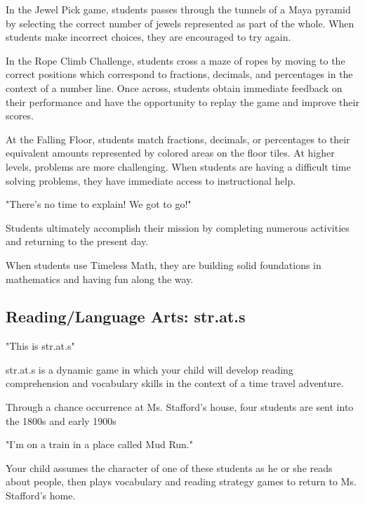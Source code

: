 In the Jewel Pick game, students passes through the tunnels of a Maya pyramid by selecting the correct number of jewels represented as part of the whole.
When students make incorrect choices, they are encouraged to try again.

In the Rope Climb Challenge, students cross a maze of ropes by moving to the correct positions which correspond to fractions, decimals, and percentages in the context of a number line.
Once across, students obtain immediate feedback on their performance and have the opportunity to replay the game and improve their scores.

At the Falling Floor, students match fractions, decimals, or percentages to their equivalent amounts represented by colored areas on the floor tiles.
At higher levels, problems are more challenging.
When students are having a difficult time solving problems, they have immediate access to instructional help.

"There's no time to explain!
We got to go!"

Students ultimately accomplish their mission by completing numerous activities and returning to the present day.

When students use Timeless Math, they are building solid foundations in mathematics and having fun along the way.

\subsection{Reading/Language Arts: str.at.s}

"This is str.at.s"

str.at.s is a dynamic game in which your child will develop reading comprehension and vocabulary skills in the context of a time travel adventure.

Through a chance occurrence at Ms. Stafford's house, four students are sent into the 1800s and early 1900s

"I'm on a train in a place called Mud Run."

Your child assumes the character of one of these students as he or she reads about people, then plays vocabulary and reading strategy games to return to Ms. Stafford's home.
